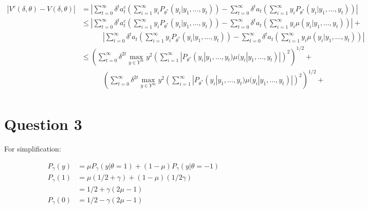 \documentclass{article}
\begin{document}
\[
  \begin{split}
  |V^c(\delta, \theta) - V(\delta, \theta)| & = \left|
      \sum_{t=0}^{\infty} \delta^t a^c_t 
        \left(\sum_{i = 1}^{\infty} y_i P_{\theta^*}(y_i|y_1, \ldots, y_t)\right) - 
      \sum_{t=0}^{\infty} \delta^t a_t 
        \left(\sum_{i = 1}^{\infty} y_i P_{\theta^*}(y_i|y_1, \ldots, y_t)\right)
      \right| \\
    & \le \left|
        \sum_{t=0}^{\infty} \delta^t a^c_t 
          \left(\sum_{i = 1}^{\infty} y_i P_{\theta^*}(y_i|y_1, \ldots, y_t)\right) - 
        \sum_{t=0}^{\infty} \delta^t a_t 
          \left(\sum_{i = 1}^{\infty} y_i \mu(y_i|y_1, \ldots, y_t)\right)
        \right| + \\ 
      & \qquad\quad \left|
        \sum_{t=0}^{\infty} \delta^t a_t 
          \left(\sum_{i = 1}^{\infty} y_i P_{\theta^*}(y_i|y_1, \ldots, y_t)\right) - 
        \sum_{t=0}^{\infty} \delta^t a_t 
          \left(\sum_{i = 1}^{\infty} y_i \mu(y_i|y_1, \ldots, y_t)\right)
        \right| \\
    & \le \left(
        \sum_{t=0}^{\infty} \delta^{2t} \max_{y \in Y^{\infty}} y^2
            \left(\sum_{i = 1}^{\infty} |
                P_{\theta^*}(y_i|y_1, \ldots, y_t)
                \mu(y_i|y_1, \ldots, y_t)|\right)^2\right)^{1/2} + \\
      & \qquad\quad \left(
        \sum_{t=0}^{\infty} \delta^{2t} \max_{y \in Y^{\infty}} y^2
            \left(\sum_{i = 1}^{\infty} |
                P_{\theta^*}(y_i|y_1, \ldots, y_t)
                \mu(y_i|y_1, \ldots, y_t)|\right)^2\right)^{1/2} + \\
  \end{split}
\]


\section{Question 3}%
\label{sec:Question 3}

For simplification:

\[
\begin{split}
  P_{\gamma}(y) & = \mu P_{\gamma}(y| \theta = 1) + (1 - \mu)P_{\gamma}(y|\theta = -1) \\
  P_{\gamma}(1) & = \mu (1/2 + \gamma) + (1 - \mu)(1/2 \gamma) \\
                & = 1/2 + \gamma(2\mu - 1) \\
  P_{\gamma}(0) & = 1/2 - \gamma(2\mu - 1)
\end{split}
\]
\end{document}
